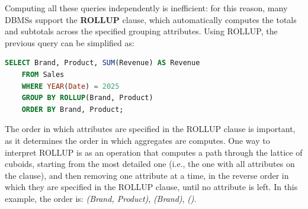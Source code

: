 Computing all these queries independently is inefficient: for this reason, many DBMSs support the \textbf{ROLLUP} clause, which automatically computes the totals and subtotals across the specified grouping attributes. Using ROLLUP, the previous query can be simplified as:
\begin{lstlisting}[language=SQL]
    SELECT Brand, Product, SUM(Revenue) AS Revenue
    FROM Sales
    WHERE YEAR(Date) = 2025
    GROUP BY ROLLUP(Brand, Product)
    ORDER BY Brand, Product;
\end{lstlisting}
The order in which attributes are specified in the ROLLUP clause is important, as it determines the order in which aggregates are computes. One way to interpret ROLLUP is as an operation that computes a path through the lattice of cuboids, starting from the most detailed one (i.e., the one with all attributes on the clause), and then removing one attribute at a time, in the reverse order in which they are specified in the ROLLUP clause, until no attribute is left. In this example, the order is: \textit{(Brand, Product)}, \textit{(Brand)}, \textit{()}.

